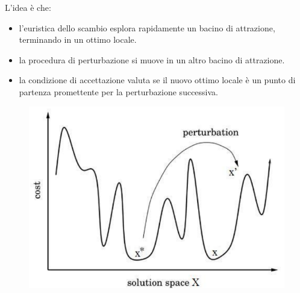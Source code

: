 \documentclass{article}
\begin{document}
L'idea è che:
\begin{itemize}
    \item l'euristica dello scambio esplora rapidamente un
    bacino di attrazione, terminando in un ottimo locale.
    \item la procedura di perturbazione si muove in un altro bacino di attrazione.
    \item la condizione di accettazione valuta se il nuovo ottimo locale è un
    punto di partenza promettente per la perturbazione successiva.
\end{itemize}
\begin{figure}[H]
    \centering
    \includegraphics[scale=0.5]{images/optbasins.png}
\end{figure}
\end{document}
